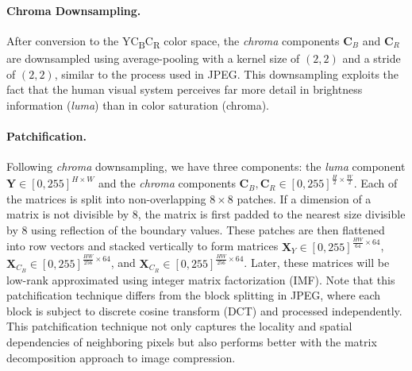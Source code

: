 
\paragraph{Chroma Downsampling.} 
After conversion to the YC\textsubscript{B}C\textsubscript{R} color space, the \emph{chroma} components $\bm{C}_B$ and $\bm{C}_R$ are downsampled using average-pooling with a kernel size of $(2, 2)$ and a stride of $(2, 2)$, similar to the process used in JPEG. This downsampling exploits the fact that the human visual system perceives far more detail in brightness information (\emph{luma}) than in color saturation ({chroma}).

\paragraph{Patchification.}
Following \emph{chroma} downsampling, we have three components:  the \emph{luma} component $\bm{Y} \in [0, 255]^{H \times W}$ and the \emph{chroma} components $\bm{C}_B, \bm{C}_R \in [0, 255]^{\frac{H}{2} \times \frac{W}{2}}$. Each of the matrices is split into non-overlapping $8 \times 8$ patches. If a dimension of a matrix is not divisible by 8, the matrix is first padded to the nearest size divisible by 8 using reflection of the boundary values. These patches are then flattened into row vectors and stacked vertically to form matrices $\bm{X}_{Y} \in [0, 255]^{\frac{HW}{64} \times 64}$, $\bm{X}_{C_B} \in [0, 255]^{\frac{HW}{256} \times 64}$, and $\bm{X}_{C_R} \in [0, 255]^{\frac{HW}{256} \times 64}$. Later, these matrices will be low-rank approximated using integer matrix factorization (IMF). Note that this patchification technique differs from the block splitting in JPEG, where each block is subject to discrete cosine transform (DCT) and processed independently. This patchification technique not only captures the locality and spatial dependencies of neighboring pixels but also performs better with the matrix decomposition approach to image compression.

